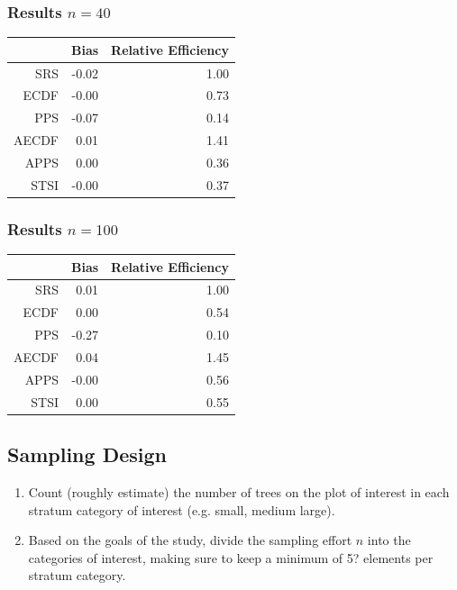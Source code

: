 \documentclass{beamer}
\begin{document}
%
\begin{frame}
  \frametitle{Results $n = 40$}
  \begin{table}[ht]
  \centering
  \begin{tabular}{rrr}
    \hline
    & Bias & Relative Efficiency \\ 
    \hline
    SRS & -0.02 & 1.00 \\ 
    ECDF & -0.00 & 0.73 \\ 
    PPS & -0.07 & 0.14 \\ 
    AECDF & 0.01 & 1.41 \\ 
    APPS & 0.00 & 0.36 \\ 
    STSI & -0.00 & 0.37 \\ 
     \hline
  \end{tabular}
  \end{table} 
\end{frame}
%
\begin{frame}
  \frametitle{Results $n = 100$}
  \begin{table}[ht]
  \centering
  \begin{tabular}{rrr}
    \hline
    & Bias & Relative Efficiency \\ 
   \hline
    SRS & 0.01 & 1.00 \\ 
    ECDF & 0.00 & 0.54 \\ 
    PPS & -0.27 & 0.10 \\ 
    AECDF & 0.04 & 1.45 \\ 
    APPS & -0.00 & 0.56 \\ 
    STSI & 0.00 & 0.55 \\ 
   \hline
  \end{tabular}
  \end{table}
\end{frame}
%
\begin{frame}
  \section{Sampling Design}
  \begin{enumerate}
    \item Count (roughly estimate) the number of trees on the plot of interest in each stratum category of interest (e.g. small, medium large). \vspace{3mm}
    \item Based on the goals of the study, divide the sampling effort $n$ into the categories of interest, making sure to keep a minimum of 5? elements per stratum category.
  \end{enumerate}
\end{frame}
\end{document}
